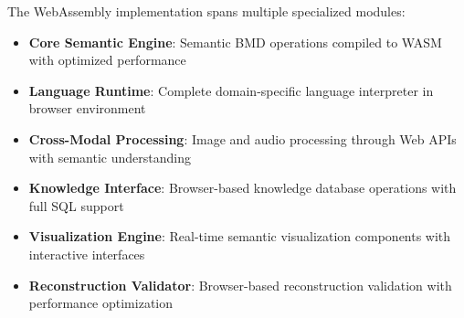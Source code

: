 \documentclass[12pt,a4paper,twoside]{article}
\begin{document}
The WebAssembly implementation spans multiple specialized modules:

\begin{itemize}
\item \textbf{Core Semantic Engine}: Semantic BMD operations compiled to WASM with optimized performance
\item \textbf{Language Runtime}: Complete domain-specific language interpreter in browser environment
\item \textbf{Cross-Modal Processing}: Image and audio processing through Web APIs with semantic understanding
\item \textbf{Knowledge Interface}: Browser-based knowledge database operations with full SQL support
\item \textbf{Visualization Engine}: Real-time semantic visualization components with interactive interfaces
\item \textbf{Reconstruction Validator}: Browser-based reconstruction validation with performance optimization
\end{itemize}
\end{document}
